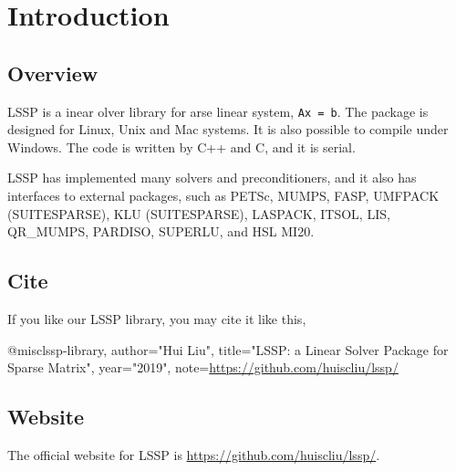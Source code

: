 
\chapter{Introduction}

\section{Overview}

LSSP is a {\textbf{\color{red}{L}}}inear {\textbf{\color{red}{S}}}olver 
library for {\textbf{\color{red}{SP}}}arse linear system, \verb|Ax = b|. 
The package is designed for Linux, Unix and Mac systems. 
It is also possible to compile under Windows. 
The code is written by C++ and C, and it is serial.

LSSP has implemented many solvers and preconditioners, and it also has interfaces to external packages, 
     such as PETSc, MUMPS, FASP, UMFPACK (SUITESPARSE), KLU (SUITESPARSE), LASPACK, 
     ITSOL, LIS, QR\_MUMPS, PARDISO, SUPERLU, and HSL MI20.

\section{Cite}
If you like our LSSP library, you may cite it like this,
\begin{evb}
@misc{lssp-library,
    author="Hui Liu",
    title="LSSP: a Linear Solver Package for Sparse Matrix",
    year="2019",
    note={\url{https://github.com/huiscliu/lssp/}}
}
\end{evb}


\section{Website}
The official website for LSSP is \url{https://github.com/huiscliu/lssp/}.


